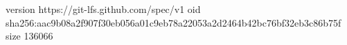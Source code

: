 version https://git-lfs.github.com/spec/v1
oid sha256:aac9b08a2f907f30eb056a01c9eb78a22053a2d2464b42bc76bf32eb3c86b75f
size 136066
